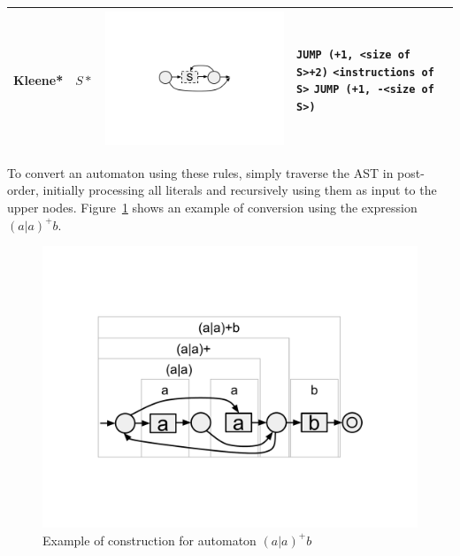 \documentclass{llncs}
\begin{document}
\begin{table}
\begin{center}
\begin{tabular}{ >{\centering\arraybackslash}m{0.6in} | >{\centering\arraybackslash}m{0.7in} | >{\centering\arraybackslash}m{1.3in} | m{1.8in} }
		Kleene* & $S*$ & \includegraphics[trim=4in 3.7in 4in 3.5in, scale=0.20]{figures/thompson_kleene.pdf} &
            \texttt{JUMP (+1, <size of S>+2)} \newline
            \texttt{<instructions of S>}  \newline
            \texttt{JUMP (+1, -<size of S>)}
        \\
		\hline
	\end{tabular}
\end{center}
\end{table}

To convert an automaton using these rules, simply traverse the AST in post-order, initially processing all literals and recursively using them as input to the upper nodes. Figure~\ref{fig:exemplo_automato_completo} shows an example of conversion using the expression $(a|a)^+b$.

\begin{figure}[!htbp]
  \centering
  \includegraphics[trim=2in 2in 2in 3in, scale=0.25]{figures/complete_example_automaton.pdf}
  \caption{Example of construction for automaton $(a|a)^+b$}
  \label{fig:exemplo_automato_completo}
\end{figure}
\end{document}
